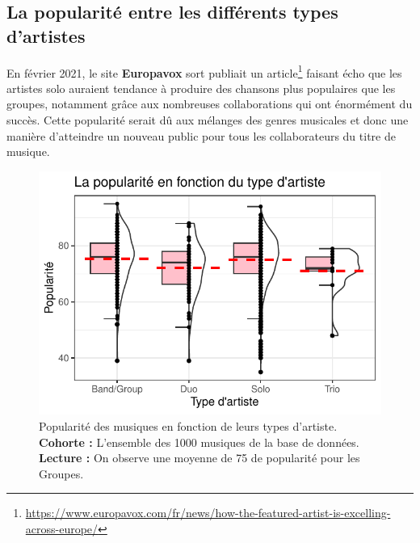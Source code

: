 \documentclass[french,]{compterendu}
\let\rmarkdownfootnote\footnote%
\def\footnote{\protect\rmarkdownfootnote}
\theoremstyle{urcastyle}
\theoremstyle{remark}
\begin{document}
\hypertarget{la-popularituxe9-entre-les-diffuxe9rents-types-dartistes}{%
\subsection{La popularité entre les différents types d'artistes}\label{la-popularituxe9-entre-les-diffuxe9rents-types-dartistes}}

En février 2021, le site \textbf{Europavox} sort publiait un article\footnote{\url{https://www.europavox.com/fr/news/how-the-featured-artist-is-excelling-across-europe/}} \autocite{ferreira_amorim_abiassi_collaborations_2021} faisant écho que les artistes solo auraient tendance à produire des chansons plus populaires que les groupes, notamment grâce aux nombreuses collaborations qui ont énormément du succès. Cette popularité serait dû aux mélanges des genres musicales et donc une manière d'atteindre un nouveau public pour tous les collaborateurs du titre de musique.





\begin{figure}[ht!]

{\centering \includegraphics{ERTAS_ELIF-CR_SEP0831_files/figure-latex/PopArtisteType-1} 

}

\caption{Popularité des musiques en fonction de leurs types d'artiste.\newline
\textbf{Cohorte :} L'ensemble des 1000 musiques de la base de données. \newline
\textbf{Lecture :} On observe une moyenne de 75 de popularité pour les Groupes.}\label{fig:PopArtisteType}
\end{figure}
\end{document}
